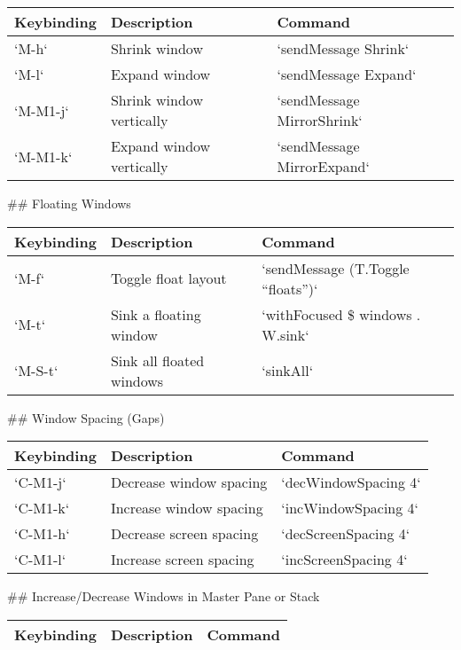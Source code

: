 \documentclass[11pt]{article}
\begin{document}
\begin{center}
\begin{tabular}{lll}
Keybinding & Description & Command\\
\hline
`M-h` & Shrink window & `sendMessage Shrink`\\
`M-l` & Expand window & `sendMessage Expand`\\
`M-M1-j` & Shrink window vertically & `sendMessage MirrorShrink`\\
`M-M1-k` & Expand window vertically & `sendMessage MirrorExpand`\\
\end{tabular}
\end{center}

\#\# Floating Windows

\begin{center}
\begin{tabular}{lll}
Keybinding & Description & Command\\
\hline
`M-f` & Toggle float layout & `sendMessage (T.Toggle ``floats'')`\\
`M-t` & Sink a floating window & `withFocused \$ windows . W.sink`\\
`M-S-t` & Sink all floated windows & `sinkAll`\\
\end{tabular}
\end{center}

\#\# Window Spacing (Gaps)

\begin{center}
\begin{tabular}{lll}
Keybinding & Description & Command\\
\hline
`C-M1-j` & Decrease window spacing & `decWindowSpacing 4`\\
`C-M1-k` & Increase window spacing & `incWindowSpacing 4`\\
`C-M1-h` & Decrease screen spacing & `decScreenSpacing 4`\\
`C-M1-l` & Increase screen spacing & `incScreenSpacing 4`\\
\end{tabular}
\end{center}

\#\# Increase/Decrease Windows in Master Pane or Stack

\begin{center}
\begin{tabular}{lll}
Keybinding & Description & Command\\
\hline
\end{tabular}
\end{center}
\end{document}
